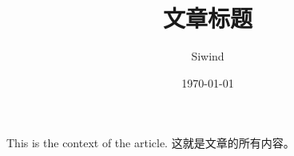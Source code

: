 \documentclass[UTF8]{ctexart}
\title{文章标题}
\author{Siwind}
\date{\today}
\begin{document}
\maketitle
This is the context of the article.
这就是文章的所有内容。
\end{document}
